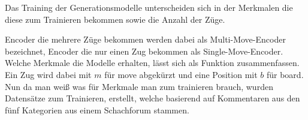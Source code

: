 Das Training der Generationsmodelle unterscheiden sich in der Merkmalen die diese zum Trainieren bekommen sowie die Anzahl der Züge.

Encoder die mehrere Züge bekommen werden dabei als Multi-Move-Encoder bezeichnet, Encoder die nur einen Zug bekommen als Single-Move-Encoder.\\

Welche Merkmale die Modelle erhalten, lässt sich als Funktion zusammenfassen. Ein Zug wird dabei mit $m$ für move abgekürzt und eine Position mit $b$ für board.\\

Nun da man weiß was für Merkmale man zum trainieren brauch, wurden Datensätze zum Trainieren, erstellt, welche basierend auf Kommentaren aus den fünf Kategorien aus einem Schachforum stammen.